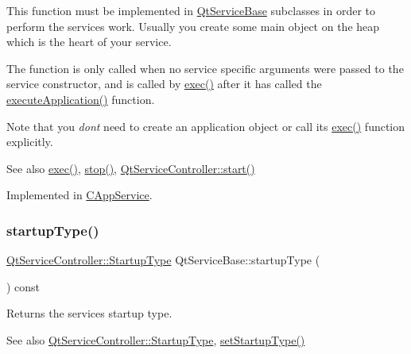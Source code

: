 This function must be implemented in \hyperlink{class_qt_service_base}{Qt\+Service\+Base} subclasses in order to perform the service\textquotesingle{}s work. Usually you create some main object on the heap which is the heart of your service.

The function is only called when no service specific arguments were passed to the service constructor, and is called by \hyperlink{class_qt_service_base_afae2e589de71c1ae3ae8db3dc9ab9c64}{exec()} after it has called the \hyperlink{class_qt_service_base_ab70633cd29a22758dfa0502b77e564f6}{execute\+Application()} function.

Note that you {\itshape don\textquotesingle{}t} need to create an application object or call its \hyperlink{class_qt_service_base_afae2e589de71c1ae3ae8db3dc9ab9c64}{exec()} function explicitly.

\begin{DoxySeeAlso}{See also}
\hyperlink{class_qt_service_base_afae2e589de71c1ae3ae8db3dc9ab9c64}{exec()}, \hyperlink{class_qt_service_base_a8d52c1b8fd06b50bdc0a0c6f9936a68e}{stop()}, \hyperlink{class_qt_service_controller_a5e9d6da5081d70f31611456d0ef0687e}{Qt\+Service\+Controller\+::start()} 
\end{DoxySeeAlso}


Implemented in \hyperlink{class_c_app_service_a9a949fe52710476fa08f64fd6b146e6b}{C\+App\+Service}.

\mbox{\label{class_qt_service_base_aa1b3bf9b7fc09777b422f49f7bcfbcbe}} 
\subsubsection{\texorpdfstring{startup\+Type()}{startupType()}}
{\footnotesize\ttfamily \hyperlink{class_qt_service_controller_a946ac2b079d9760503da923c2eaf0aac}{Qt\+Service\+Controller\+::\+Startup\+Type} Qt\+Service\+Base\+::startup\+Type (\begin{DoxyParamCaption}{ }\end{DoxyParamCaption}) const}

Returns the service\textquotesingle{}s startup type.

\begin{DoxySeeAlso}{See also}
\hyperlink{class_qt_service_controller_a946ac2b079d9760503da923c2eaf0aac}{Qt\+Service\+Controller\+::\+Startup\+Type}, \hyperlink{class_qt_service_base_a6beddd54c973c3a7d81075b2f3f80df2}{set\+Startup\+Type()} 
\end{DoxySeeAlso}
\mbox{\label{class_qt_service_base_a8d52c1b8fd06b50bdc0a0c6f9936a68e}} 
